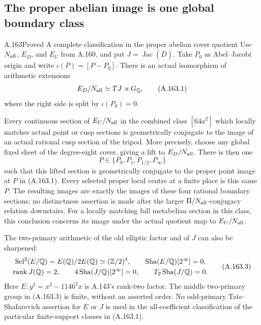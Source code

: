 \subsection{The proper abelian image is one global boundary class}

\begin{statement}{A.163}{Proved}
{A complete classification in the proper abelian cover quotient}
Use \(N_{\rm all}\), \(E_D\), and \(E_U\) from
A.160, and put \(J=\operatorname{Jac}(\overline D)\).
Take \(P_0\) as Abel--Jacobi origin and write
\(\iota(P)=[P-P_0]\).  There is an actual isomorphism
of arithmetic extensions
\[
                 E_D/N_{\rm all}\simeq TJ\rtimes G_\mathbb Q,
\tag{A.163.1}
\]
where the right side is split by \(\iota(P_0)=0\).

Every continuous section of \(E_U/N_{\rm all}\) in
the combined class \([64a^2]\) which locally matches
actual point or cusp sections is geometrically conjugate
to the image of an actual rational cusp section of the
tripod.  More precisely, choose any global fixed sheet
of the degree-eight cover, giving a lift to
\(E_D/N_{\rm all}\).  There is then one
\[
                         P\in\{P_0,P_1,P_{1/2},P_\infty\}
\tag{A.163.2}
\]
such that this lifted section is geometrically conjugate
to the proper point image at \(P\) in (A.163.1).
Every selected proper local centre at a finite place
is this same \(P\).  The resulting images are exactly
the images of these four rational boundary sections;
no distinctness assertion is made after the larger
\(\Pi/N_{\rm all}\)-conjugacy relation downstairs.
For a locally matching full metabelian section in this
class, this conclusion concerns its image under the
actual quotient map to \(E_U/N_{\rm all}\).

The two-primary arithmetic of the old elliptic factor
and of \(J\) can also be sharpened:
\[
 \begin{gathered}
 \operatorname{Sel}^{2}(E/\mathbb Q)=E(\mathbb Q)/2E(\mathbb Q)
                                  \simeq(\mathbb Z/2)^4,
       \qquad \operatorname{Sha}(E/\mathbb Q)[2^\infty]=0,\\
 \operatorname{rank}J(\mathbb Q)=2,
       \qquad 4\operatorname{Sha}(J/\mathbb Q)[2^\infty]=0,
       \qquad T_2\operatorname{Sha}(J/\mathbb Q)=0.
 \end{gathered}
\tag{A.163.3}
\]
Here \(E:y^2=x^3-1146^2x\) is A.143's rank-two
factor.  The middle two-primary group in (A.163.3)
is finite, without an asserted order.  No odd-primary
Tate--Shafarevich assertion for \(E\) or \(J\) is
used in the all-coefficient classification of the
particular finite-support classes in (A.163.1).
\end{statement}

